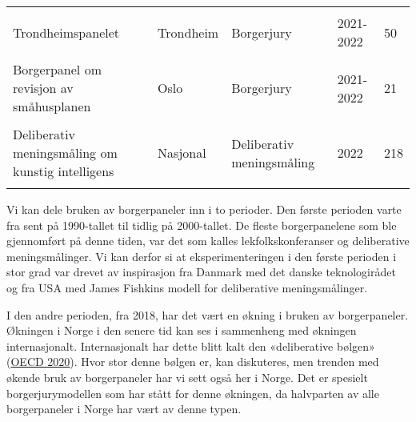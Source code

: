\documentclass[
  12pt,
  a4paper, 12pt]{article}
\begin{document}
\begin{table}[!h]
{\begin{tabular}[t]{lllll}
\cellcolor{gray!6}{Borgerpanel på Romsås} & \cellcolor{gray!6}{Oslo} & \cellcolor{gray!6}{Borgerjury} & \cellcolor{gray!6}{2021} & \cellcolor{gray!6}{14}\\
 
Trondheimspanelet & Trondheim & Borgerjury & 2021-2022 & 50\\
 
\cellcolor{gray!6}{Ungt Borgerpanel} & \cellcolor{gray!6}{Stavanger} & \cellcolor{gray!6}{Borgerjury} & \cellcolor{gray!6}{2021-2022} & \cellcolor{gray!6}{21}\\
 
Borgerpanel om revisjon av småhusplanen & Oslo & Borgerjury & 2021-2022 & 21\\
 
\cellcolor{gray!6}{Medarbeiderpanelet i Sadexxo} & \cellcolor{gray!6}{Bedrift} & \cellcolor{gray!6}{Borgerjury} & \cellcolor{gray!6}{2022} & \cellcolor{gray!6}{15}\\
 
Deliberativ meningsmåling om kunstig intelligens & Nasjonal & Deliberativ meningsmåling & 2022 & 218\\
 
\cellcolor{gray!6}{Røros borgerpanel} & \cellcolor{gray!6}{Røros} & \cellcolor{gray!6}{Borgerjury} & \cellcolor{gray!6}{2023-2025} & \cellcolor{gray!6}{16-30}\\
\bottomrule
\end{tabular}}
\end{table}

Vi kan dele bruken av borgerpaneler inn i to perioder. Den første perioden varte fra sent på 1990-tallet til tidlig på 2000-tallet. De fleste borgerpanelene som ble gjennomført på denne tiden, var det som kalles lekfolkskonferanser og deliberative meningsmålinger. Vi kan derfor si at eksperimenteringen i den første perioden i stor grad var drevet av inspirasjon fra Danmark med det danske teknologirådet og fra USA med James Fishkins modell for deliberative meningsmålinger.

I den andre perioden, fra 2018, har det vært en økning i bruken av borgerpaneler. Økningen i Norge i den senere tid kan ses i sammenheng med økningen internasjonalt. Internasjonalt har dette blitt kalt den «deliberative bølgen» (\protect\hyperlink{ref-oecd_innovative_2020}{OECD 2020}). Hvor stor denne bølgen er, kan diskuteres, men trenden med økende bruk av borgerpaneler har vi sett også her i Norge. Det er spesielt borgerjurymodellen som har stått for denne økningen, da halvparten av alle borgerpaneler i Norge har vært av denne typen.
\end{document}
